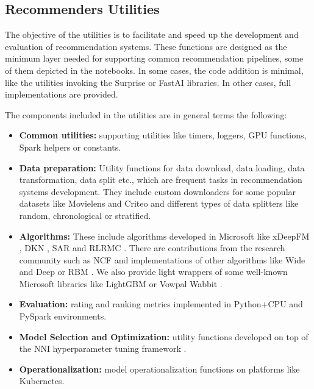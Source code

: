 \subsection{Recommenders Utilities}

The objective of the utilities is to facilitate and speed up the development and evaluation of recommendation systems.
These functions are designed as the minimum layer needed for supporting common recommendation pipelines, some of 
them depicted in the notebooks. 
In some cases, the code addition is minimal, like the utilities invoking the Surprise \cite{Surprise} or 
FastAI \cite{howard2018fastai} libraries. In other cases, full implementations are provided.

The components included in the utilities are in general terms the following: 
\begin{itemize}
    \item \textbf{Common utilities:} supporting utilities like timers, loggers, GPU functions, 
    Spark helpers or constants.
    \item \textbf{Data preparation:} Utility functions for data download, data loading, data transformation, data split etc., which are frequent tasks in recommendation systems development. They include custom downloaders for some
    popular datasets like Movielens and Criteo and different types of data splitters like random, chronological or
    stratified.     
    \item \textbf{Algorithms:} These include algorithms developed 
    in Microsoft like xDeepFM \cite{lian2018xdeepfm}, DKN \cite{wang2018dkn}, SAR \cite{diev2015sar} and RLRMC \cite{rlrmc}. There are contributions from the research community such as NCF 
    \cite{he2017neural} and implementations
    of other algorithms like Wide and Deep \cite{cheng2016wide} or RBM \cite{salakhutdinov2007restricted}. 
    We also provide light wrappers of some well-known Microsoft
    libraries like LightGBM \cite{ke2017lightgbm} or Vowpal Wabbit \cite{agarwal2014reliable}.
    \item \textbf{Evaluation:} rating and ranking metrics implemented in Python+CPU and PySpark environments.
    \item \textbf{Model Selection and Optimization:} utility functions developed on top of the NNI hyperparameter 
    tuning framework \cite{nni}. 
    \item \textbf{Operationalization:} model operationalization functions on platforms like Kubernetes.
\end{itemize}
    

